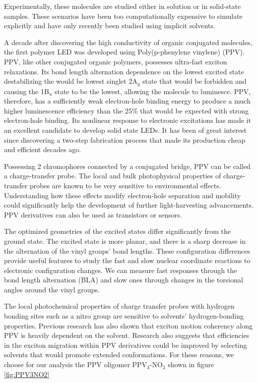 Experimentally, these molecules are studied either in solution or in solid-state samples.
These scenarios have been too computationally expensive to simulate explicitly and have only recently been studied using implicit solvents.\cite{sifain2018photoexcited}

A decade after discovering the high conductivity of organic conjugated molecules, the first polymer LED was developed using Poly(p-phenylene vinylene) (PPV).\cite{brown1992poly}
PPV, like other conjugated organic polymers, possesses ultra-fast exciton relaxations.
Its bond length alternation dependence on the lowest excited state destabilizing the would be lowest singlet 2A\(_g\) state that would be forbidden and causing the 1B\(_u\) state to be the lowest, allowing the molecule to luminesce.\cite{soos1993band}
PPV, therefore, has a sufficiently weak electron-hole binding energy to produce a much higher luminescence efficiency than the 25\% that would be expected with strong electron-hole binding. \cite{cao1999improved}
Its nonlinear response to electronic excitations has made it an excellent candidate to develop solid state LEDs. \cite{burroughes1990light,gustafsson1993plastic,friend1997electronic}
It has been of great interest since discovering a two-step fabrication process that made its production cheap and efficient decades ago.\cite{gagnon1987synthesis}

Possessing 2 chromophores connected by a conjugated bridge, PPV can be called a charge-transfer probe.
The local and bulk photophysical properties of charge-transfer probes are known to be very sensitive to environmental effects.\cite{marini2010solvatochromism}
Understanding how these effects modify electron-hole separation and mobility could significantly help the development of further light-harvesting advancements.
PPV derivatives can also be used as transistors or sensors.\cite{willander1993polymer,partridge1996high}

The optimized geometries of the excited states differ significantly from the ground state.
The excited state is more planar, and there is a sharp decrease in the alternation of the vinyl groups' bond lengths.
These configuration differences provide useful features to study the fast and slow nuclear coordinate reactions to electronic configuration changes. We can measure fast responses through the bond length alternation (BLA) and slow ones through changes in the torsional angles around the vinyl groups.

The local photochemical properties of charge transfer probes with hydrogen bonding sites such as a nitro group are sensitive to solvents' hydrogen-bonding properties.  \cite{marini2010solvatochromism}
Previous research has also shown that exciton motion coherency along PPV is heavily dependent on the solvent. \cite{collini2009coherent}
Research also suggests that efficiencies in the exciton migration within PPV derivatives could be improved by selecting solvents that would promote extended conformations.\cite{bredas2009excitons}
For these reasons, we choose for our analysis the PPV oligomer PPV\(_3\)-NO\(_2\) shown in figure \ref{fig:PPV3NO2}

